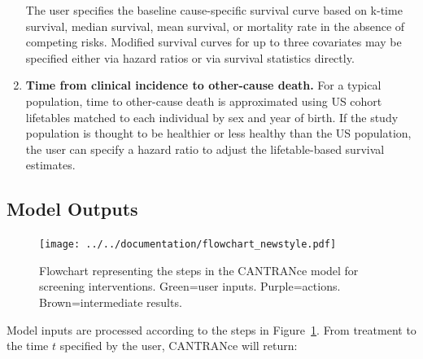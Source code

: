 \documentclass[11pt]{article}
\begin{document}
\begin{enumerate}
    The user specifies the baseline cause-specific survival curve based on k-time survival, median survival, mean survival, or mortality rate in the absence of competing risks.
    Modified survival curves for up to three covariates may be specified either via hazard ratios or via survival statistics directly.
			
    \item \textbf{Time from clinical incidence to other-cause death.} For a typical population, time to other-cause death is approximated using US cohort lifetables matched to each individual by sex and year of birth. 
        If the study population is thought to be healthier or less healthy than the US population, the user can specify a hazard ratio to adjust the lifetable-based survival estimates. 
\end{enumerate}

\subsection{Model Outputs}

\begin{figure}
        \begin{center}
            \texttt{[image: ../../documentation/flowchart\_newstyle.pdf]}
        \end{center}
        \caption{Flowchart representing the steps in the CANTRANce model for screening interventions. Green=user inputs. Purple=actions. Brown=intermediate results.}
        \label{fig:flowchart}
\end{figure}

Model inputs are processed according to the steps in Figure~\ref{fig:flowchart}. From treatment to the time $t$ specified by the user, CANTRANce will return:
\end{document}
